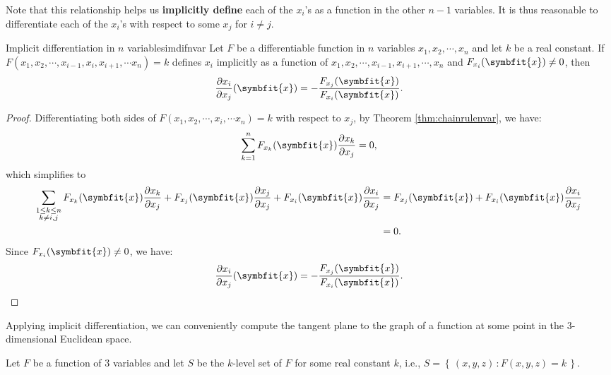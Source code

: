 \documentclass[math]{amznotes}
\theoremstyle{remark}
\begin{document}
Note that this relationship helps us {\color{red} \textbf{implicitly define}} each of the $x_i$'s as a function in the other $n - 1$ variables. It is thus reasonable to differentiate each of the $x_i$'s with respect to some $x_j$ for $i \neq j$.
\begin{thmbox}{Implicit differentiation in $n$ variables}{imdifnvar}
    Let $F$ be a differentiable function in $n$ variables $x_1, x_2, \cdots, x_n$ and let $k$ be a real constant. If $F(x_1, x_2, \cdots, x_{i - 1}, x_i, x_{i + 1}, \cdots x_n) = k$ defines $x_i$ implicitly as a function of $x_1, x_2, \cdots, x_{i - 1}, x_{i + 1}, \cdots, x_n$ and $F_{x_i}(\symbfit{x}) \neq 0$, then
    \begin{equation*}
        \frac{\partial x_i}{\partial x_j}(\symbfit{x}) = -\frac{F_{x_j}(\symbfit{x})}{F_{x_i}(\symbfit{x})}.
    \end{equation*}
    \tcblower
    \begin{proof}
        Differentiating both sides of $F(x_1, x_2, \cdots, x_i, \cdots x_n) = k$ with respect to $x_j$, by Theorem \ref{thm:chainrulenvar}, we have:
        \begin{equation*}
            \sum_{k = 1}^{n}F_{x_k}(\symbfit{x})\frac{\partial x_k}{\partial x_j} = 0,
        \end{equation*}
        which simplifies to
        \begin{align*}
            \sum_{\substack{1 \leq k \leq n \\
            k \neq i, j}}F_{x_k}(\symbfit{x})\frac{\partial x_k}{\partial x_j} + F_{x_j}(\symbfit{x})\frac{\partial x_j}{\partial x_j} + F_{x_i}(\symbfit{x})\frac{\partial x_i}{\partial x_j} & = F_{x_j}(\symbfit{x}) + F_{x_i}(\symbfit{x})\frac{\partial x_i}{\partial x_j}\\
            & = 0.
        \end{align*}
        Since $F_{x_i}(\symbfit{x}) \neq 0$, we have:
        \begin{equation*}
            \frac{\partial x_i}{\partial x_j}(\symbfit{x}) = -\frac{F_{x_j}(\symbfit{x})}{F_{x_i}(\symbfit{x})}.
        \end{equation*}
    \end{proof}
\end{thmbox}
Applying implicit differentiation, we can conveniently compute the tangent plane to the graph of a function at some point in the $3$-dimensional Euclidean space.

Let $F$ be a function of $3$ variables and let $S$ be the $k$-level set of $F$ for some real constant $k$, i.e., $S = \left\{ \, (x, y, z) \,\colon F(x, y, z) = k \, \right\}$. 
\end{document}
